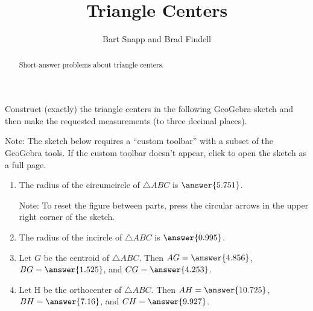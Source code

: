 \documentclass[nooutcomes]{ximera}
\title{Triangle Centers}
\author{Bart Snapp and Brad Findell}
\begin{document}
\begin{abstract}
Short-answer problems about triangle centers. 
\end{abstract}
\maketitle


\begin{problem}
Construct (exactly) the triangle centers in the following 
GeoGebra sketch and then make the requested measurements (to three decimal places).  

Note: The sketch below requires a ``custom toolbar'' with a subset of the GeoGebra tools.  If the custom toolbar doesn't appear, click 
 to open the sketch as a full page.  


\begin{center}  
\end{center}
\begin{enumerate}
\item The radius of the circumcircle of $\triangle ABC$ is 
$\answer{5.751}$.  

Note: To reset the figure between parts, press the circular arrows in the upper right corner of the sketch.   

\item The radius of the incircle of $\triangle ABC$ is 
$\answer{0.995}$.  

\item Let $G$ be the centroid of $\triangle ABC$.  
Then $AG = \answer{4.856}$, $BG = \answer{1.525}$, 
and $CG = \answer{4.253}$.  

\item Let H be the orthocenter of $\triangle ABC$. 
Then $AH = \answer{10.725}$, $BH = \answer{7.16}$, 
and $CH = \answer{9.927}$. 
\end{enumerate}

\end{problem}
\end{document}
